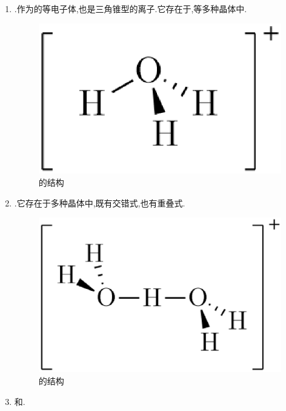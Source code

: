 \documentclass{ctexart}
\begin{document}
\begin{enumerate}[label=\tbf{\arabic*},topsep=0pt,parsep=0pt,itemsep=0pt,partopsep=0pt]
    \item {}.作为的等电子体,也是三角锥型的离子.它存在于\ce{[H3O][SbF6]},\ce{[H3O][HSO4]}等多种晶体中.
        \begin{figure}[H]
            \centering\includegraphics[scale=0.25]{picture/H3O+.eps}
            \caption{的结构}
        \end{figure}
    \item {}.它存在于多种晶体中,既有交错式,也有重叠式.
        \begin{figure}[H]
            \centering\includegraphics[scale=0.25]{picture/H5O2+.eps}
            \caption{的结构}
        \end{figure}
    \item {}和.
        \begin{figure}[H]
            \centering

\end{figure}
\end{enumerate}
\end{document}
